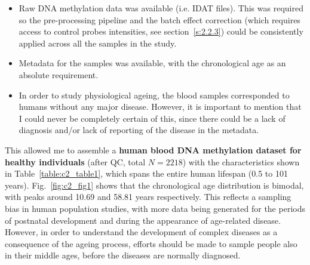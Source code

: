 \begin{itemize}
	
	\item Raw DNA methylation data was available (i.e. IDAT files). This was required so the pre-processing pipeline and the batch effect correction (which requires access to control probes intensities, see section~\ref{s:2.2.3}) could be consistently applied across all the samples in the study.
	
	\item Metadata for the samples was available, with the chronological age as an absolute requirement. 
	
	\item In order to study physiological ageing, the blood samples corresponded to humans without any major disease. However, it is important to mention that I could never be completely certain of this, since there could be a lack of diagnosis and/or lack of reporting of the disease in the metadata. 
	
\end{itemize}

\smallskip

This allowed me to assemble a \textbf{human blood DNA methylation dataset for healthy individuals} (after \acrshort{QC}, total $N=2218$) with the characteristics shown in Table~\ref{table:c2_table1}, which spans the entire human lifespan (0.5 to 101 years). Fig.~\ref{fig:c2_fig1} shows that the chronological age distribution is bimodal, with peaks around 10.69 and 58.81 years respectively. This reflects a sampling bias in human population studies, with more data being generated for the periods of postnatal development and during the appearance of age-related disease. However, in order to understand the development of complex diseases as a consequence of the ageing process, efforts should be made to sample people also in their middle ages, before the diseases are normally diagnosed.   


